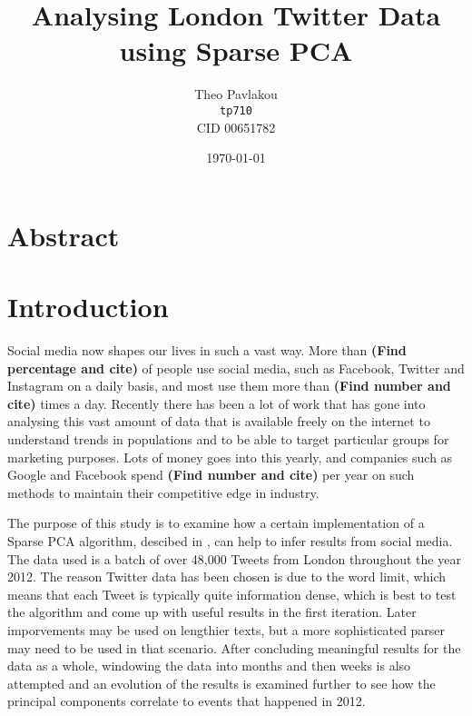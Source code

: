 \documentclass[11pt,a4paper]{article}
\begin{document}
\title{Analysing London Twitter Data using Sparse PCA}
\author{
Theo Pavlakou\\ \texttt{tp710}\\ CID 00651782\\
}
\date{\today}
\maketitle
{}
\newpage


\section*{\center Abstract}

\clearpage
{}

\section{Introduction}
Social media now shapes our lives in such a vast way. More than \textbf{(Find percentage and cite)} of people use social media, such as Facebook, Twitter and Instagram on a daily basis, and most use them more than \textbf{(Find number and cite)} times a day. Recently there has been a lot of work that has gone into analysing this vast amount of data that is available freely on the internet to understand trends in populations and to be able to target particular groups for marketing purposes. Lots of money goes into this yearly, and companies such as Google and Facebook spend \textbf{(Find number and cite)} per year on such methods to maintain their competitive edge in industry. 

The purpose of this study is to examine how a certain implementation of a Sparse PCA algorithm, descibed in \cite{dimakis}, can help to infer results from social media. The data used is a batch of over 48,000 Tweets from London throughout the year 2012. The reason Twitter data has been chosen is due to the word limit, which means that each Tweet is typically quite information dense, which is best to test the algorithm and come up with useful results in the first iteration. Later imporvements may be used on lengthier texts, but a more sophisticated parser may need to be used in that scenario. After concluding meaningful results for the data as a whole, windowing the data into months and then weeks is also attempted and an evolution of the results is examined further to see how the principal components correlate to events that happened in 2012. 
\end{document}
